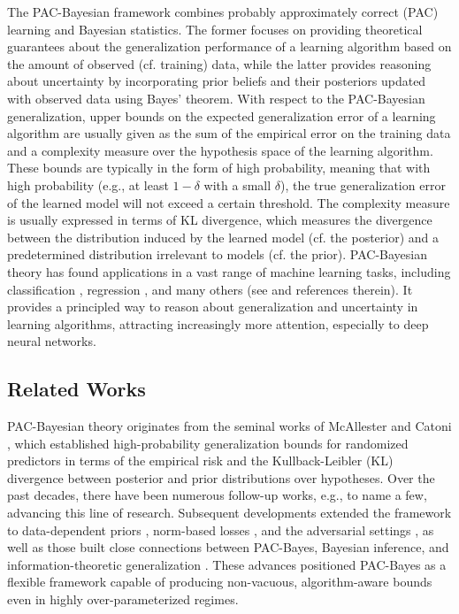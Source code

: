 \documentclass[journal]{IEEEtran} %
\begin{document}
The PAC-Bayesian framework combines probably approximately correct (PAC) learning and Bayesian statistics. The former focuses on providing theoretical guarantees about the generalization performance of a learning algorithm based on the amount of observed (cf. training) data, while the latter provides reasoning about uncertainty by incorporating prior beliefs and their posteriors updated with observed data using Bayes' theorem.
% 
With respect to the PAC-Bayesian generalization, upper bounds on the expected generalization error of a learning algorithm are usually given as the sum of the empirical error on the training data and a complexity measure over the hypothesis space of the learning algorithm. These bounds are typically in the form of high probability, meaning that with high probability (e.g., at least $1-\delta$ with a small $\delta$), the true generalization error of the learned model will not exceed a certain threshold.
% 
The complexity measure is usually expressed in terms of KL divergence, which measures the divergence between the distribution induced by the learned model (cf. the posterior) and a predetermined distribution irrelevant to models (cf. the prior). 
PAC-Bayesian theory has found applications in a vast range of machine learning tasks, including classification \cite{mcallester1998some,mcallester1999pac,mcallester2003simplified,langford2002pac}, regression \cite{alquier2016properties,germain2016pac,shalaeva2020improved,guo2025pacbayes}, and many others (see \cite{alquier2024user,guedj2019primer} and references therein). It provides a principled way to reason about generalization and uncertainty in learning algorithms, attracting increasingly more attention, especially to deep neural networks.


\subsection{Related Works}
% 
PAC-Bayesian theory originates from the seminal works of McAllester \cite{mcallester1998some,mcallester1999pac} and Catoni \cite{catoni2007pac}, which established high-probability generalization bounds for randomized predictors in terms of the empirical risk and the Kullback-Leibler (KL) divergence between posterior and prior distributions over hypotheses. 
%  
Over the past decades, there have been numerous follow-up works, e.g., \cite{langford2002pac,seeger2002pac,maurer2004note} to name a few, advancing this line of research. Subsequent developments extended the framework to data-dependent priors \cite{parrado2012pac,dziugaite2018data}, norm-based losses \cite{mcallester2003simplified,neyshabur2018pac}, and the adversarial settings \cite{viallard2021pac,xiao2023pac}, as well as those built close connections between PAC-Bayes, Bayesian inference, and information-theoretic generalization \cite{hellstrom2025generalization}. These advances positioned PAC-Bayes as a flexible framework capable of producing non-vacuous, algorithm-aware bounds even in highly over-parameterized regimes. 
%
\end{document}
